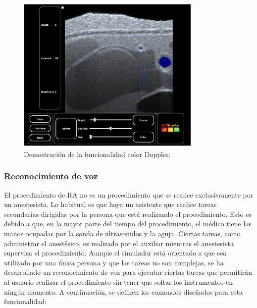 \begin{figure}[ht]
    \centering
    \includegraphics[width=0.8\textwidth]{IMG/uscolor.PNG}
    \caption{Demostración de la funcionalidad color Doppler.}
    \label{fig:doppler}
\end{figure}
 
\subsubsection{Reconocimiento de voz}

El procedimiento de \ac{RA} no es un procedimiento que se realice exclusivamente por un anestesista. Lo habitual es que haya un asistente que  realice tareas secundarias dirigidas por la persona que está realizando el procedimiento. Esto es debido a que, en la mayor parte del tiempo del procedimiento, el médico tiene las manos ocupadas por la sonda de ultrasonidos y la aguja. Ciertas tareas, como administrar el anestésico, es realizado por el auxiliar mientras el anestesista supervisa el procedimiento. Aunque el simulador está orientado a que sea utilizado por una única persona y que las tareas no son complejas, se ha desarrollado un reconocimiento de voz para ejecutar ciertas tareas que permitirán al usuario realizar el procedimiento sin tener que soltar los instrumentos en ningún momento. A continuación, se definen los comandos diseñados para esta funcionalidad:

